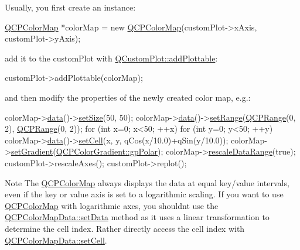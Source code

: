 Usually, you first create an instance\+: 
\begin{DoxyCode}
\hyperlink{class_q_c_p_color_map}{QCPColorMap} *colorMap = \textcolor{keyword}{new} \hyperlink{class_q_c_p_color_map_aa37e976d2ee1e2be6c4cd88a64b36215}{QCPColorMap}(customPlot->xAxis, customPlot->yAxis);
\end{DoxyCode}
 add it to the custom\+Plot with \hyperlink{class_q_custom_plot_ab7ad9174f701f9c6f64e378df77927a6}{Q\+Custom\+Plot\+::add\+Plottable}\+: 
\begin{DoxyCode}
customPlot->addPlottable(colorMap);
\end{DoxyCode}
 and then modify the properties of the newly created color map, e.\+g.\+: 
\begin{DoxyCode}
colorMap->\hyperlink{class_q_c_p_color_map_a3ae12c9ce842352037cd20ea5267414f}{data}()->\hyperlink{class_q_c_p_color_map_data_a0d9ff35c299d0478b682bfbcdd9c097e}{setSize}(50, 50);
colorMap->\hyperlink{class_q_c_p_color_map_a3ae12c9ce842352037cd20ea5267414f}{data}()->\hyperlink{class_q_c_p_color_map_data_aad9c1c7c703c1339489fc730517c83d4}{setRange}(\hyperlink{class_q_c_p_range}{QCPRange}(0, 2), \hyperlink{class_q_c_p_range}{QCPRange}(0, 2));
\textcolor{keywordflow}{for} (\textcolor{keywordtype}{int} x=0; x<50; ++x)
  \textcolor{keywordflow}{for} (\textcolor{keywordtype}{int} y=0; y<50; ++y)
    colorMap->\hyperlink{class_q_c_p_color_map_a3ae12c9ce842352037cd20ea5267414f}{data}()->\hyperlink{class_q_c_p_color_map_data_a8e75eaf8746596319032a93f3d2d0683}{setCell}(x, y, qCos(x/10.0)+qSin(y/10.0));
colorMap->\hyperlink{class_q_c_p_color_map_a7313c78360471cead3576341a2c50377}{setGradient}(\hyperlink{class_q_c_p_color_gradient_aed6569828fee337023670272910c9072ab7414ce4e36dc3e82e0132a7f0f41b52}{QCPColorGradient::gpPolar});
colorMap->\hyperlink{class_q_c_p_color_map_a856608fa3dd1cc290bcd5f29a5575774}{rescaleDataRange}(\textcolor{keyword}{true});
customPlot->rescaleAxes();
customPlot->replot();
\end{DoxyCode}


\begin{DoxyNote}{Note}
The \hyperlink{class_q_c_p_color_map}{Q\+C\+P\+Color\+Map} always displays the data at equal key/value intervals, even if the key or value axis is set to a logarithmic scaling. If you want to use \hyperlink{class_q_c_p_color_map}{Q\+C\+P\+Color\+Map} with logarithmic axes, you shouldn\textquotesingle{}t use the \hyperlink{class_q_c_p_color_map_data_afd2083ccfd6987ec94aa7ef8e91ca39a}{Q\+C\+P\+Color\+Map\+Data\+::set\+Data} method as it uses a linear transformation to determine the cell index. Rather directly access the cell index with \hyperlink{class_q_c_p_color_map_data_a8e75eaf8746596319032a93f3d2d0683}{Q\+C\+P\+Color\+Map\+Data\+::set\+Cell}. 
\end{DoxyNote}


